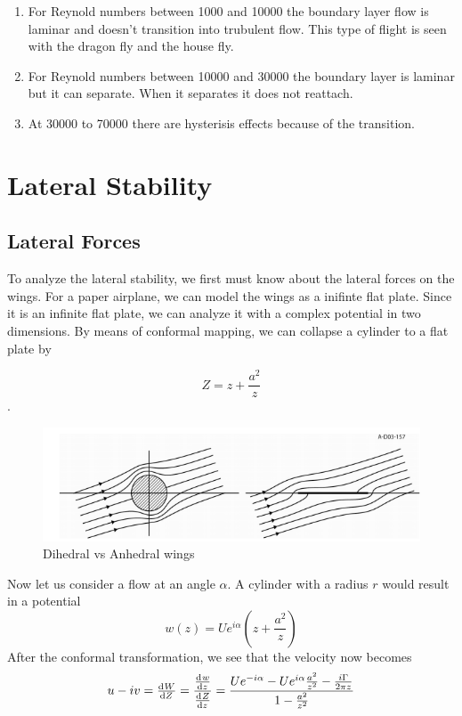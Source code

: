 \begin{enumerate}
\item For Reynold numbers between 1000 and 10000 the boundary layer flow is laminar
and doesn't transition into trubulent flow. This type of flight is seen with
the dragon fly and the house fly. 
\item  For Reynold numbers between 10000 and 30000 the boundary layer is laminar but
it can separate. When it separates it does not reattach.
\item At 30000 to 70000 there are hysterisis effects because of the transition. 

\end{enumerate}

\section{Lateral Stability}

\subsection{Lateral Forces}

To analyze the lateral stability, we first must know about the lateral forces on the wings.
For a paper airplane, we can model the wings as a inifinte flat plate. Since it is
an infinite flat plate, we can analyze it with a complex potential in two dimensions.
By means of conformal mapping, we can collapse a cylinder to a flat plate by

\[Z = z + \frac{a^2}{z}\].

\begin{figure}[hl]
  \centering
    \includegraphics[scale=.5]{figures/flatplate1.png}
    \caption{Dihedral vs Anhedral wings}
  \label{fig:dihedraleffect}
\end{figure}

Now let us consider a flow at an angle $\alpha$. A cylinder with a radius $r$
would result in a potential
\[w(z) = Ue^{i\alpha}(z + \frac{a^2}{z}) \]
After the conformal transformation, we see that the velocity now becomes
\[u - iv = \od{W}{Z} = \frac{\od{w}{z}}{\od{Z}{z}} = \frac{Ue^{-i\alpha}-Ue^{i\alpha}\frac{a^2}{z^2}
- \frac{i \Gamma}{2\pi z}}{1 - \frac{a^2}{z^2}}\]

